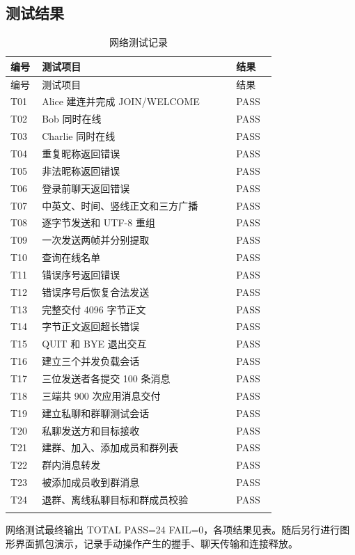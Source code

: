 \documentclass[UTF8,a4paper,10pt,fontset=fandol]{ctexart}
\begin{document}
\subsection{测试结果}
\begin{longtable}{@{}>{\raggedright\arraybackslash}p{0.113\linewidth}>{\raggedright\arraybackslash}p{0.685\linewidth}>{\raggedright\arraybackslash}p{0.141\linewidth}@{}}
\toprule
编号 & 测试项目 & 结果\\
\midrule\endfirsthead
\toprule
编号 & 测试项目 & 结果\\
\midrule\endhead
T01 & Alice 建连并完成 JOIN/WELCOME & PASS\\
T02 & Bob 同时在线 & PASS\\
T03 & Charlie 同时在线 & PASS\\
T04 & 重复昵称返回错误 & PASS\\
T05 & 非法昵称返回错误 & PASS\\
T06 & 登录前聊天返回错误 & PASS\\
T07 & 中英文、时间、竖线正文和三方广播 & PASS\\
T08 & 逐字节发送和 UTF-8 重组 & PASS\\
T09 & 一次发送两帧并分别提取 & PASS\\
T10 & 查询在线名单 & PASS\\
T11 & 错误序号返回错误 & PASS\\
T12 & 错误序号后恢复合法发送 & PASS\\
T13 & 完整交付 4096 字节正文 & PASS\\
T14 & 4097 字节正文返回超长错误 & PASS\\
T15 & QUIT 和 BYE 退出交互 & PASS\\
T16 & 建立三个并发负载会话 & PASS\\
T17 & 三位发送者各提交 100 条消息 & PASS\\
T18 & 三端共 900 次应用消息交付 & PASS\\
T19 & 建立私聊和群聊测试会话 & PASS\\
T20 & 私聊发送方和目标接收 & PASS\\
T21 & 建群、加入、添加成员和群列表 & PASS\\
T22 & 群内消息转发 & PASS\\
T23 & 被添加成员收到群消息 & PASS\\
T24 & 退群、离线私聊目标和群成员校验 & PASS\\*
\bottomrule
\caption{网络测试记录}\\
\end{longtable}
网络测试最终输出 TOTAL PASS=24 FAIL=0，各项结果见表。随后另行进行图形界面抓包演示，记录手动操作产生的握手、聊天传输和连接释放。
\end{document}
